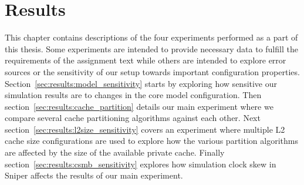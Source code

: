 

\chapter{Results}
\label{cpt:results}

This chapter contains descriptions of the four experiments performed as a part of this thesis.
Some experiments are intended to provide necessary data to fulfill the requirements of the assignment text while others are intended to explore error sources or the sensitivity of our setup towards important configuration properties.
Section~\ref{sec:results:model_sensitivity} starts by exploring how sensitive our simulation results are to changes in the core model configuration. 
Then section~\ref{sec:results:cache_partition} details our main experiment where we compare several cache partitioning algorithms against each other.
Next section~\ref{sec:results:l2size_sensitivity} covers an experiment where multiple L2 cache size configurations are used to explore how the various partition algorithms are affected by the size of the available private cache.
Finally section~\ref{sec:results:csmb_sensitivity} explores how simulation clock skew in Sniper affects the results of our main experiment.








